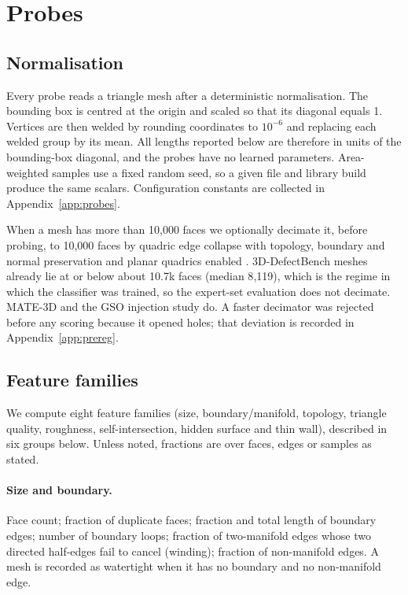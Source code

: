 \section{Probes}
\label{sec:method}

\subsection{Normalisation}
Every probe reads a triangle mesh after a deterministic normalisation.
The bounding box is centred at the origin and scaled so that its diagonal equals 1.
Vertices are then welded by rounding coordinates to \(10^{-6}\) and replacing each welded group by its mean.
All lengths reported below are therefore in units of the bounding-box diagonal, and the probes have no learned parameters.
Area-weighted samples use a fixed random seed, so a given file and library build produce the same scalars.
Configuration constants are collected in Appendix~\ref{app:probes}.

When a mesh has more than 10{,}000 faces we optionally decimate it, before probing, to 10{,}000 faces by quadric edge collapse with topology, boundary and normal preservation and planar quadrics enabled \citep{garland1997qem,cignoni2008meshlab}.
3D-DefectBench meshes already lie at or below about 10.7k faces (median 8{,}119), which is the regime in which the classifier was trained, so the expert-set evaluation does not decimate.
MATE-3D and the GSO injection study do.
A faster decimator was rejected before any scoring because it opened holes; that deviation is recorded in Appendix~\ref{app:prereg}.

\subsection{Feature families}
We compute eight feature families (size, boundary/manifold, topology, triangle quality, roughness, self-intersection, hidden surface and thin wall), described in six groups below.
Unless noted, fractions are over faces, edges or samples as stated.

\paragraph{Size and boundary.}
Face count; fraction of duplicate faces; fraction and total length of boundary edges; number of boundary loops; fraction of two-manifold edges whose two directed half-edges fail to cancel (winding); fraction of non-manifold edges.
A mesh is recorded as watertight when it has no boundary and no non-manifold edge.


